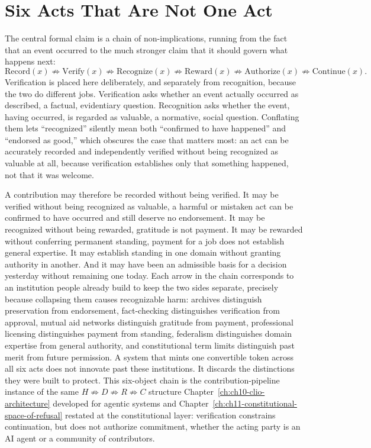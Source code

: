 \section{Six Acts That Are Not One Act}

The central formal claim is a chain of non-implications, running from the fact that an event occurred to the much stronger claim that it should govern what happens next:
\[
\mathrm{Record}(x) \not\Rightarrow \mathrm{Verify}(x) \not\Rightarrow \mathrm{Recognize}(x) \not\Rightarrow \mathrm{Reward}(x) \not\Rightarrow \mathrm{Authorize}(x) \not\Rightarrow \mathrm{Continue}(x).
\]
Verification is placed here deliberately, and separately from recognition, because the two do different jobs. Verification asks whether an event actually occurred as described, a factual, evidentiary question. Recognition asks whether the event, having occurred, is regarded as valuable, a normative, social question. Conflating them lets ``recognized'' silently mean both ``confirmed to have happened'' and ``endorsed as good,'' which obscures the case that matters most: an act can be accurately recorded and independently verified without being recognized as valuable at all, because verification establishes only that something happened, not that it was welcome.

A contribution may therefore be recorded without being verified. It may be verified without being recognized as valuable, a harmful or mistaken act can be confirmed to have occurred and still deserve no endorsement. It may be recognized without being rewarded, gratitude is not payment. It may be rewarded without conferring permanent standing, payment for a job does not establish general expertise. It may establish standing in one domain without granting authority in another. And it may have been an admissible basis for a decision yesterday without remaining one today. Each arrow in the chain corresponds to an institution people already build to keep the two sides separate, precisely because collapsing them causes recognizable harm: archives distinguish preservation from endorsement, fact-checking distinguishes verification from approval, mutual aid networks distinguish gratitude from payment, professional licensing distinguishes payment from standing, federalism distinguishes domain expertise from general authority, and constitutional term limits distinguish past merit from future permission. A system that mints one convertible token across all six acts does not innovate past these institutions. It discards the distinctions they were built to protect. This six-object chain is the contribution-pipeline instance of the same $H \not\Rightarrow D \not\Rightarrow R \not\Rightarrow C$ structure Chapter~\ref{ch:ch10-clio-architecture} developed for agentic systems and Chapter~\ref{ch:ch11-constitutional-space-of-refusal} restated at the constitutional layer: verification constrains continuation, but does not authorize commitment, whether the acting party is an AI agent or a community of contributors.

